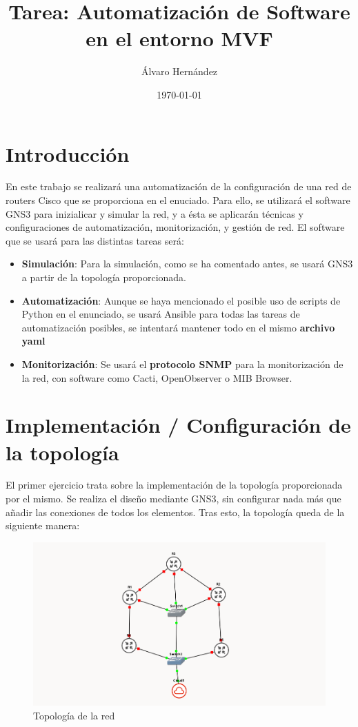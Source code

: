 \documentclass[11pt]{article}
\title{Tarea: Automatización de Software en el entorno MVF}
\author{Álvaro Hernández}
\date{\today}
\begin{document}

\maketitle 
\tableofcontents 
\newpage

\section*{Introducción}

En este trabajo se realizará una automatización de la configuración de una red de routers Cisco que se proporciona en el enuciado.
Para ello, se utilizará el software GNS3 para inizialicar y simular la red, y a ésta se aplicarán técnicas y configuraciones de automatización, monitorización, y gestión de red. 
El software que se usará para las distintas tareas será:

\begin{itemize}
    \item \textbf{Simulación}: Para la simulación, como se ha comentado antes, se usará GNS3 a partir de la topología proporcionada.
    \item \textbf{Automatización}: Aunque se haya mencionado el posible uso de scripts de Python en el enunciado, se usará Ansible para todas las tareas de automatización posibles, se intentará mantener todo en el mismo \textbf{archivo yaml}
    \item \textbf{Monitorización}: Se usará el \textbf{protocolo SNMP} para la monitorización de la red, con software como Cacti, OpenObserver o MIB Browser.
\end{itemize}

\section{Implementación / Configuración de la topología}

El primer ejercicio trata sobre la implementación de la topología proporcionada por el mismo. Se realiza el diseño mediante GNS3, sin configurar nada más que añadir las conexiones de todos los elementos. Tras esto, la topología queda de la siguiente manera:


\begin{figure}[h]
    \centering
    \includegraphics[width=\textwidth]{src/topologia.png}
    \caption{Topología de la red}
\end{figure}
\end{document}
